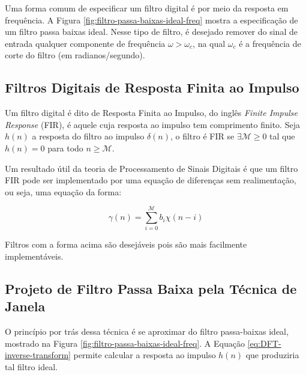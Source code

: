 {Uma forma comum de especificar um filtro digital é por meio da resposta em frequência. A Figura \ref{fig:filtro-passa-baixas-ideal-freq} mostra a especificação de um filtro passa baixas ideal. Nesse tipo de filtro, é desejado remover do sinal de entrada qualquer componente de frequência $\omega > \omega_c$, na qual $\omega_c$ é a frequência de corte do filtro (em radianos/segundo).

\subsection{Filtros Digitais de Resposta Finita ao Impulso}

Um filtro digital é dito de  Resposta Finita ao Impulso, do inglês \textit{Finite Impulse Response} (FIR), é aquele cuja resposta ao impulso tem comprimento finito. Seja $h(n)$ a resposta do filtro ao impulso $\delta(n)$, o filtro é FIR se $\exists \mathcal{M} \geq 0$ tal que $h(n) = 0$ para todo $n \geq \mathcal{M}$.

Um resultado útil da teoria de Processamento de Sinais Digitais é que um filtro FIR pode ser implementado por uma equação de diferenças sem realimentação, ou seja, uma equação da forma:

\begin{equation}
    \gamma(n) = 	\sum_{i=0}^{\mathcal{M}} b_i \chi(n-i)
\end{equation}

Filtros com a forma acima são desejáveis pois são mais facilmente implementáveis.

\subsection{Projeto de Filtro Passa Baixa pela Técnica de Janela}

O princípio por trás dessa técnica é se aproximar do filtro passa-baixas ideal,
mostrado na Figura \ref{fig:filtro-passa-baixas-ideal-freq}. A Equação \ref{eq:DFT-inverse-transform}
 permite calcular a resposta ao impulso $h(n)$ que produziria tal filtro ideal.

}
